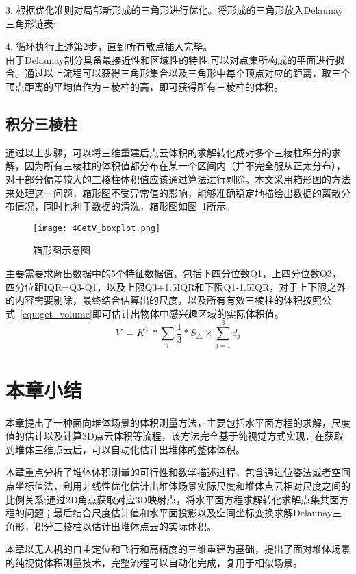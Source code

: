 3. 根据优化准则对局部新形成的三角形进行优化。将形成的三角形放入Delaunay三角形链表;

4. 循环执行上述第2步，直到所有散点插入完毕。\\
由于Delaunay剖分具备最接近性和区域性的特性,可以对点集所构成的平面进行拟合。通过以上流程可以获得三角形集合以及三角形中每个顶点对应的距离，取三个顶点距离的平均值作为三棱柱的高，即可获得所有三棱柱的体积。
\subsection{积分三棱柱}
\label{sec:4.4.4}
通过以上步骤，可以将三维重建后点云体积的求解转化成对多个三棱柱积分的求解，因为所有三棱柱的体积值都分布在某一个区间内（并不完全服从正太分布），对于部分偏差较大的三棱柱体积值应该通过算法进行剔除。本文采用箱形图的方法来处理这一问题，箱形图不受异常值的影响，能够准确稳定地描绘出数据的离散分布情况，同时也利于数据的清洗，箱形图如图~\ref{fig:4GetV_boxplot}所示。
\begin{figure}[H] %
  \centering
  \texttt{[image: 4GetV\_boxplot.png]}
  \caption{箱形图示意图}
  \label{fig:4GetV_boxplot}
\end{figure}
主要需要求解出数据中的5个特征数据值，包括下四分位数Q1，上四分位数Q3，四分位距IQR=Q3-Q1，以及上限Q3+1.5IQR和下限Q1-1.5IQR，对于上下限之外的内容需要剔除，最终结合\label{sec:4.3}估算出的尺度，以及所有有效三棱柱的体积按照公式~\ref{equ:get_volume}即可估计出物体中感兴趣区域的实际体积值。
\begin{equation}
  V\;=K^3\;\ast\sum_i\frac13\ast S_\bigtriangleup\times\sum_{j=1}^3d_j\label{equ:get_volume}
\end{equation}
\section{本章小结}
本章提出了一种面向堆体场景的体积测量方法，主要包括水平面方程的求解，尺度值的估计以及计算3D点云体积等流程，该方法完全基于纯视觉方式实现，在获取到堆体三维点云后，可以自动化估计出堆体的整体体积。

本章重点分析了堆体体积测量的可行性和数学描述过程，包含通过位姿法或者空间点坐标值法，利用非线性优化估计出堆体场景实际尺度和堆体点云相对尺度之间的比例关系;通过2D角点获取对应3D映射点，将水平面方程求解转化求解点集共面方程的问题；最后结合尺度估计值和水平面投影以及空间坐标变换求解Delaunay三角形，积分三棱柱以估计出堆体点云的实际体积。

本章以无人机的自主定位和飞行和高精度的三维重建为基础，提出了面对堆体场景的纯视觉体积测量技术，完整流程可以自动化完成，复用于相似场景。






